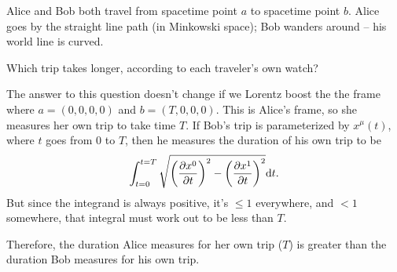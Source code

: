 \documentclass{article}
\begin{document}
\bigskip
\par
\begin{prob}
Alice and Bob both travel from spacetime point $a$ to spacetime point $b$. Alice goes by the straight line path (in Minkowski space); Bob wanders around -- his world line is curved.
\par
Which trip takes longer, according to each traveler’s own watch?
\end{prob}
The answer to this question doesn't change if we Lorentz boost the the frame where $a = (0, 0, 0, 0)$ and $b = (T, 0, 0, 0)$. This is Alice's frame, so she measures her own trip to take time $T$. If Bob's trip is parameterized by $x^\mu(t)$, where $t$ goes from $0$ to $T$, then he measures the duration of his own trip to be
\[ \int_{t=0}^{t=T} \sqrt{ \left( \frac{\partial x^0}{\partial t} \right)^2 - \left( \frac{\partial x^1}{\partial t} \right)^2} \mathrm{d} t. \]
But since the integrand is always positive, it's $\leq 1$ everywhere, and $<1$ somewhere, that integral must work out to be less than $T$.
\par
Therefore, the duration Alice measures for her own trip ($T$) is greater than the duration Bob measures for his own trip.


\end{document}
